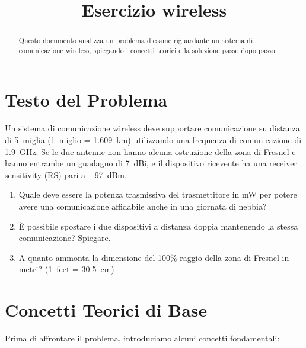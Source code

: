 \title{Esercizio wireless}




\maketitle
\begin{abstract}
Questo documento analizza un problema d'esame riguardante un sistema di comunicazione wireless, spiegando i concetti teorici e la soluzione passo dopo passo.
\end{abstract}

\section*{Testo del Problema}
Un sistema di comunicazione wireless deve supportare comunicazione su distanza di \SI{5}{miglia} (\SI{1}{miglio} = \SI{1.609}{km}) utilizzando una frequenza di comunicazione di \SI{1.9}{GHz}. Se le due antenne non hanno alcuna ostruzione della zona di Fresnel e hanno entrambe un guadagno di \SI{+7}{dBi}, e il dispositivo ricevente ha una receiver sensitivity (RS) pari a \SI{-97}{dBm}.

\begin{enumerate}[label=\textbf{\Alph*)}]
    \item Quale deve essere la potenza trasmissiva del trasmettitore in \si{mW} per potere avere una comunicazione affidabile anche in una giornata di nebbia?
    \item È possibile spostare i due dispositivi a distanza doppia mantenendo la stessa comunicazione? Spiegare.
    \item A quanto ammonta la dimensione del 100\% raggio della zona di Fresnel in metri? (\SI{1}{feet} = \SI{30.5}{cm})
\end{enumerate}

\section{Concetti Teorici di Base}
Prima di affrontare il problema, introduciamo alcuni concetti fondamentali:

